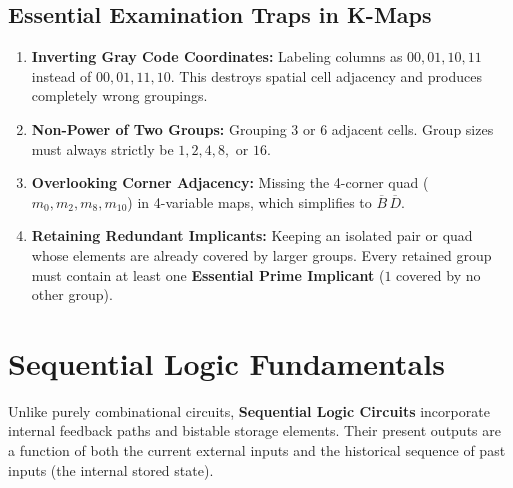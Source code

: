 \subsection{Essential Examination Traps in K-Maps}
\begin{enumerate}[label=\bfseries\arabic*.]
    \item \textbf{Inverting Gray Code Coordinates:} Labeling columns as $00, 01, 10, 11$ instead of $00, 01, 11, 10$. This destroys spatial cell adjacency and produces completely wrong groupings.
    \item \textbf{Non-Power of Two Groups:} Grouping 3 or 6 adjacent cells. Group sizes must always strictly be $1, 2, 4, 8, \text{ or } 16$.
    \item \textbf{Overlooking Corner Adjacency:} Missing the 4-corner quad ($m_0, m_2, m_8, m_{10}$) in 4-variable maps, which simplifies to $\overline{B}\,\overline{D}$.
    \item \textbf{Retaining Redundant Implicants:} Keeping an isolated pair or quad whose elements are already covered by larger groups. Every retained group must contain at least one \textbf{Essential Prime Implicant} ($1$ covered by no other group).
\end{enumerate}



\section{Sequential Logic Fundamentals}
\label{sec:sequential_logic}

Unlike purely combinational circuits, \textbf{Sequential Logic Circuits} incorporate internal feedback paths and bistable storage elements. Their present outputs are a function of both the current external inputs and the historical sequence of past inputs (the internal stored state).

